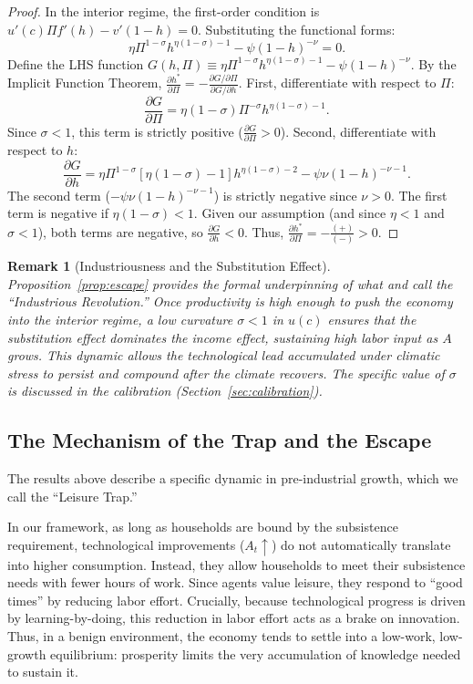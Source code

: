 \documentclass[11pt,a4paper]{article}
\newtheorem{remark}{Remark}
\begin{document}
\begin{proof}
  In the interior regime, the first-order condition is \(u'(c)\Pi f'(h) - v'(1-h) = 0\). Substituting the functional forms:
  \[ \eta \Pi^{1-\sigma} h^{\eta(1-\sigma)-1} - \psi (1-h)^{-\nu} = 0. \]
  Define the LHS function \(G(h, \Pi) \equiv \eta \Pi^{1-\sigma} h^{\eta(1-\sigma)-1} - \psi (1-h)^{-\nu}\).
  By the Implicit Function Theorem, \(\frac{\partial h^*}{\partial \Pi} = - \frac{\partial G / \partial \Pi}{\partial G / \partial h}\).
  First, differentiate with respect to \(\Pi\):
  \[ \frac{\partial G}{\partial \Pi} = \eta (1-\sigma) \Pi^{-\sigma} h^{\eta(1-\sigma)-1}. \]
  Since \(\sigma < 1\), this term is strictly positive (\(\frac{\partial G}{\partial \Pi} > 0\)).
  Second, differentiate with respect to \(h\):
  \[ \frac{\partial G}{\partial h} = \eta \Pi^{1-\sigma} [\eta(1-\sigma)-1] h^{\eta(1-\sigma)-2} - \psi \nu (1-h)^{-\nu-1}. \]
  The second term (\(-\psi \nu (1-h)^{-\nu-1}\)) is strictly negative since \(\nu>0\). The first term is negative if \(\eta(1-\sigma) < 1\). Given our assumption (and since \(\eta < 1\) and \(\sigma < 1\)), both terms are negative, so \(\frac{\partial G}{\partial h} < 0\).
  Thus, \(\frac{\partial h^*}{\partial \Pi} = - \frac{(+)}{(-)} > 0\).
\end{proof}

\begin{remark}[Industriousness and the Substitution Effect]
  \label{rem:sigma}
  Proposition~\ref{prop:escape} provides the formal underpinning of what \textcite{Voth2001} and \textcite{DeVries2008} call the ``Industrious Revolution.'' Once productivity is high enough to push the economy into the interior regime, a low curvature \(\sigma < 1\) in \(u(c)\) ensures that the substitution effect dominates the income effect, sustaining high labor input as \(A\) grows. This dynamic allows the technological lead accumulated under climatic stress to persist and compound after the climate recovers. The specific value of \(\sigma\) is discussed in the calibration (Section~\ref{sec:calibration}).
\end{remark}

\subsection*{The Mechanism of the Trap and the Escape}

The results above describe a specific dynamic in pre-industrial growth, which we call the ``Leisure Trap.''

In our framework, as long as households are bound by the subsistence requirement, technological improvements (\(A_t \uparrow\)) do not automatically translate into higher consumption. Instead, they allow households to meet their subsistence needs with fewer hours of work. Since agents value leisure, they respond to ``good times'' by reducing labor effort. Crucially, because technological progress is driven by learning-by-doing, this reduction in labor effort acts as a brake on innovation. Thus, in a benign environment, the economy tends to settle into a low-work, low-growth equilibrium: prosperity limits the very accumulation of knowledge needed to sustain it.
\end{document}
